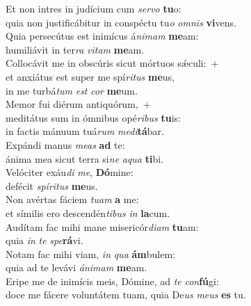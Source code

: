 \evenverse Et non intres in judícium cum \textit{ser}\textit{vo} \textbf{tu}o:~\*\\
\evenverse quia non justificábitur in conspéctu tu\textit{o} \textit{om}\textit{nis} \textbf{vi}vens.\\
\oddverse Quia persecútus est inimícus á\textit{ni}\textit{mam} \textbf{me}am:~\*\\
\oddverse humiliávit in ter\textit{ra} \textit{vi}\textit{tam} \textbf{me}am.\\
\evenverse Collocávit me in obscúris sicut mórtuos sǽculi:~+\\
\evenverse  et anxiátus est super me spí\textit{ri}\textit{tus} \textbf{me}us,~\*\\
\evenverse in me turbá\textit{tum} \textit{est} \textit{cor} \textbf{me}um.\\
\oddverse Memor fui diérum antiquórum,~+\\
\oddverse  meditátus sum in ómnibus opé\textit{ri}\textit{bus} \textbf{tu}is:~\*\\
\oddverse in factis mánuum tuá\textit{rum} \textit{me}\textit{di}\textbf{tá}bar.\\
\evenverse Expándi manus \textit{me}\textit{as} \textbf{ad} te:~\*\\
\evenverse ánima mea sicut terra si\textit{ne} \textit{a}\textit{qua} \textbf{ti}bi.\\
\oddverse Velóciter exáu\textit{di} \textit{me}, \textbf{Dó}mine:~\*\\
\oddverse defécit \textit{spí}\textit{ri}\textit{tus} \textbf{me}us.\\
\evenverse Non avértas fáciem \textit{tu}\textit{am} \textbf{a} me:~\*\\
\evenverse et símilis ero descendén\textit{ti}\textit{bus} \textit{in} \textbf{la}cum.\\
\oddverse Audítam fac mihi mane misericór\textit{di}\textit{am} \textbf{tu}am:~\*\\
\oddverse quia \textit{in} \textit{te} \textit{spe}\textbf{rá}vi.\\
\evenverse Notam fac mihi viam, \textit{in} \textit{qua} \textbf{ám}bulem:~\*\\
\evenverse quia ad te levávi \textit{á}\textit{ni}\textit{mam} \textbf{me}am.\\
\oddverse Eripe me de inimícis meis, Dómine, ad \textit{te} \textit{con}\textbf{fú}gi:~\*\\
\oddverse doce me fácere voluntátem tuam, quia De\textit{us} \textit{me}\textit{us} \textbf{es} tu.\\
